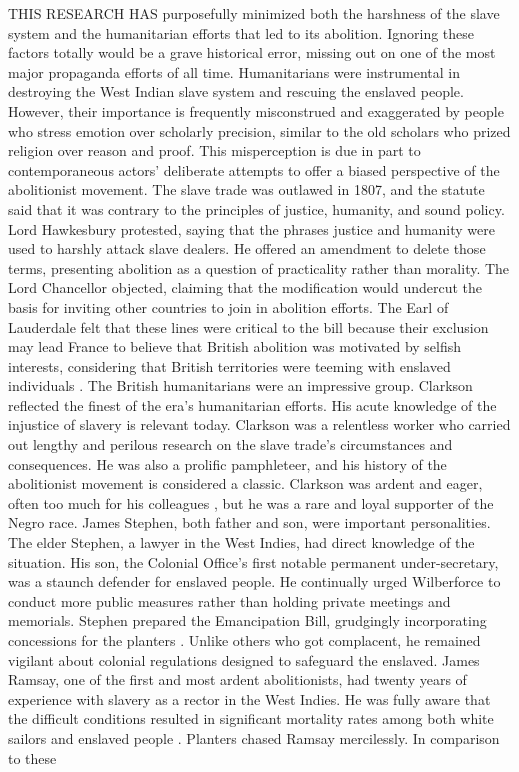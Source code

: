 THIS RESEARCH HAS purposefully minimized both the harshness of the slave system and the humanitarian efforts that led to its abolition. Ignoring these factors totally would be a grave historical error, missing out on one of the most major propaganda efforts of all time. Humanitarians were instrumental in destroying the West Indian slave system and rescuing the enslaved people. However, their importance is frequently misconstrued and exaggerated by people who stress emotion over scholarly precision, similar to the old scholars who prized religion over reason and proof. This misperception is due in part to contemporaneous actors' deliberate attempts to offer a biased perspective of the abolitionist movement. The slave trade was outlawed in 1807, and the statute said that it was contrary to the principles of justice, humanity, and sound policy. Lord Hawkesbury protested, saying that the phrases justice and humanity were used to harshly attack slave dealers. He offered an amendment to delete those terms, presenting abolition as a question of practicality rather than morality. The Lord Chancellor objected, claiming that the modification would undercut the basis for inviting other countries to join in abolition efforts. The Earl of Lauderdale felt that these lines were critical to the bill because their exclusion may lead France to believe that British abolition was motivated by selfish interests, considering that British territories were teeming with enslaved individuals . The British humanitarians were an impressive group. Clarkson reflected the finest of the era's humanitarian efforts. His acute knowledge of the injustice of slavery is relevant today. Clarkson was a relentless worker who carried out lengthy and perilous research on the slave trade's circumstances and consequences. He was also a prolific pamphleteer, and his history of the abolitionist movement is considered a classic. Clarkson was ardent and eager, often too much for his colleagues , but he was a rare and loyal supporter of the Negro race. James Stephen, both father and son, were important personalities. The elder Stephen, a lawyer in the West Indies, had direct knowledge of the situation. His son, the Colonial Office's first notable permanent under-secretary, was a staunch defender for enslaved people. He continually urged Wilberforce to conduct more public measures rather than holding private meetings and memorials. Stephen prepared the Emancipation Bill, grudgingly incorporating concessions for the planters . Unlike others who got complacent, he remained vigilant about colonial regulations designed to safeguard the enslaved. James Ramsay, one of the first and most ardent abolitionists, had twenty years of experience with slavery as a rector in the West Indies. He was fully aware that the difficult conditions resulted in significant mortality rates among both white sailors and enslaved people . Planters chased Ramsay mercilessly. In comparison to these 